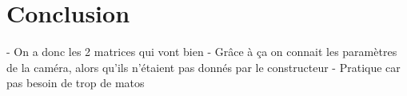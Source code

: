 \documentclass{article}
\begin{document}



\section{Conclusion}

- On a donc les 2 matrices qui vont bien
- Grâce à ça on connait les paramètres de la caméra, alors qu'ils n'étaient pas donnés par le constructeur
- Pratique car pas besoin de trop de matos

\end{document}
